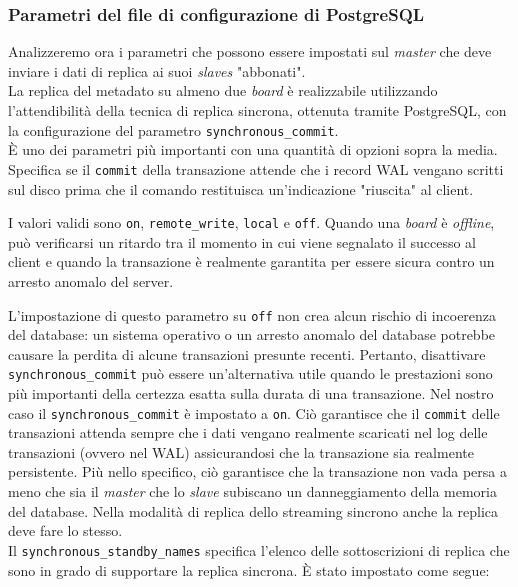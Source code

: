 \subsubsection{Parametri del file di configurazione di PostgreSQL}
Analizzeremo ora i parametri che possono essere impostati sul \textit{master} che deve inviare i dati di replica ai suoi \textit{slaves} "abbonati".\\

La replica del metadato su almeno due \textit{board} \`{e} realizzabile utilizzando l'attendibilit\`{a} della tecnica di replica sincrona, ottenuta tramite PostgreSQL, con la configurazione del parametro \verb"synchronous_commit".\\
\`{E} uno dei parametri pi\`{u} importanti con una quantit\`{a} di opzioni sopra la media. Specifica se il \verb"commit" della transazione attende che i record WAL vengano scritti sul disco prima che il comando restituisca un'indicazione "riuscita" al client. 

I valori validi sono \verb"on", \verb"remote_write", \verb"local" e \verb"off". Quando una \textit{board} \`{e} \textit{offline}, pu\`{o} verificarsi un ritardo tra il momento in cui viene segnalato il successo al client e quando la transazione \`{e} realmente garantita per essere sicura contro un arresto anomalo del server. 

L'impostazione di questo parametro su \verb"off" non crea alcun rischio di incoerenza del database: un sistema operativo o un arresto anomalo del database potrebbe causare la perdita di alcune transazioni presunte recenti. Pertanto, disattivare \verb"synchronous_commit" pu\`{o} essere un'alternativa utile quando le prestazioni sono pi\`{u} importanti della certezza esatta sulla durata di una transazione.\cite{etichetta12}
Nel nostro caso il \verb"synchronous_commit" \`{e} impostato a \verb"on". Ci\`{o} garantisce che il \verb"commit" delle transazioni attenda sempre che i dati vengano realmente scaricati nel log delle transazioni (ovvero nel WAL) assicurandosi che la transazione sia realmente persistente. Pi\`{u} nello specifico, ci\`{o} garantisce che la transazione non vada persa a meno che sia il \textit{master} che lo \textit{slave} subiscano un danneggiamento della memoria del database. 
Nella modalit\`{a} di replica dello streaming sincrono anche la replica deve fare lo stesso.\\

Il \verb"synchronous_standby_names" specifica l'elenco delle sottoscrizioni di replica che sono in grado di supportare la replica sincrona. \`{E} stato impostato come segue:

